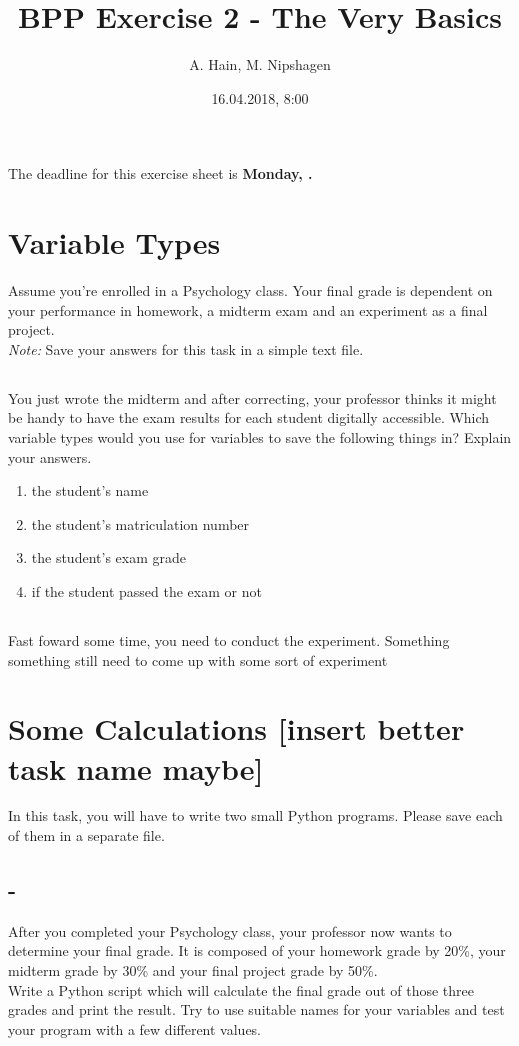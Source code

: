 \documentclass{article}
\title{BPP Exercise 2 - The Very Basics}
\author{A. Hain, M. Nipshagen}
\date{16.04.2018, 8:00}
\makeatletter
\let\thedate\@date
\makeatother
\begin{document}
The deadline for this exercise sheet is \textbf{Monday, \thedate.}
%
%
\section{Variable Types}
Assume you're enrolled in a Psychology class.
Your final grade is dependent on your performance in homework, a midterm exam and an experiment as a final project.\\
\textit{Note:} Save your answers for this task in a simple text file.

\subsection{}
You just wrote the midterm and after correcting, your professor thinks it might be handy
to have the exam results for each student digitally accessible. Which variable types would you use
for variables to save the following things in? Explain your answers.
\begin{enumerate}
\item the student's name
\item the student's matriculation number
\item the student's exam grade
\item if the student passed the exam or not
\end{enumerate}

\subsection{}
Fast foward some time, you need to conduct the experiment.
Something something still need to come up with some sort of experiment

\section{Some Calculations [insert better task name maybe]}
In this task, you will have to write two small Python programs. Please save each
of them in a separate file.

\subsection{-}
After you completed your Psychology class, your professor now wants to determine your final grade.
It is composed of your homework grade by 20\%, your midterm grade by 30\% and your final
project grade by 50\%.\\
Write a Python script which will calculate the final grade out of those three grades
and print the result. Try to use suitable names for your variables and test your program with
a few different values.
\end{document}
